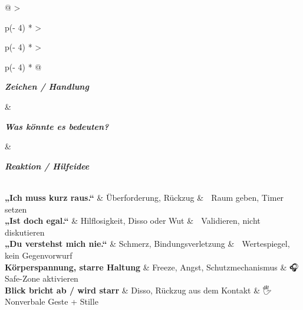 \begin{longtable}[]{@{}
  >{\raggedright\arraybackslash}p{(\columnwidth - 4\tabcolsep) * }
  >{\raggedright\arraybackslash}p{(\columnwidth - 4\tabcolsep) * }
  >{\raggedright\arraybackslash}p{(\columnwidth - 4\tabcolsep) * }@{}}
\toprule\noalign{}
\begin{minipage}[b]{\linewidth}\raggedright
\emph{\textbf{Zeichen / Handlung}}
\end{minipage} \& \begin{minipage}[b]{\linewidth}\raggedright
\emph{\textbf{Was könnte es bedeuten?}}
\end{minipage} \& \begin{minipage}[b]{\linewidth}\raggedright
\emph{\textbf{Reaktion / Hilfeidee}}
\end{minipage} \\
\midrule\noalign{}
\endhead
\bottomrule\noalign{}
\endlastfoot
\textbf{„Ich muss kurz raus.``} \& Überforderung, Rückzug \& 🧍 Raum geben, Timer setzen \\
\textbf{„Ist doch egal.``} \& Hilflosigkeit, Disso oder Wut \& 💬 Validieren, nicht diskutieren \\
\textbf{„Du verstehst mich nie.``} \& Schmerz, Bindungsverletzung \& 🧠 Wertespiegel, kein Gegenvorwurf \\
\textbf{Körperspannung, starre Haltung} \& Freeze, Angst, Schutzmechanismus \& 🎧 Safe-Zone aktivieren \\
\textbf{Blick bricht ab / wird starr} \& Disso, Rückzug aus dem Kontakt \& 🖐️ Nonverbale Geste + Stille \\

\end{longtable}
